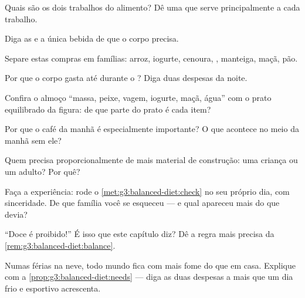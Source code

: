 \begin{exercise}[$\star$]\label{exo:g3:balanced-diet:1}
Quais são os dois trabalhos do alimento? Dê uma 
que serve principalmente a cada trabalho.
\end{exercise}

\begin{exercise}[$\star$]\label{exo:g3:balanced-diet:2}
Diga as  e a única bebida de que o corpo
precisa.
\end{exercise}

\begin{exercise}[$\star$]\label{exo:g3:balanced-diet:3}
Separe estas compras em famílias: arroz, iogurte, cenoura, ,
manteiga, maçã, pão.
\end{exercise}

\begin{exercise}[$\star$]\label{exo:g3:balanced-diet:4}
Por que o corpo gasta  até durante o ? Diga duas despesas
da noite.
\end{exercise}

\begin{exercise}[$\star$]\label{exo:g3:balanced-diet:5}
Confira o almoço ``massa, peixe, vagem, iogurte, maçã, água'' com o
prato equilibrado da figura: de que parte do prato é cada item?
\end{exercise}

\begin{exercise}[$\star$]\label{exo:g3:balanced-diet:6}
Por que o café da manhã é especialmente importante? O que acontece
no meio da manhã sem ele?
\end{exercise}

\begin{exercise}[$\star$]\label{exo:g3:balanced-diet:7}
Quem precisa proporcionalmente de mais material de construção: uma
criança ou um adulto? Por quê?
\end{exercise}

\begin{exercise}[$\star$]\label{exo:g3:balanced-diet:8}
Faça a experiência: rode o \cref{met:g3:balanced-diet:check} no seu
próprio dia, com sinceridade. De que família você se esqueceu --- e
qual apareceu mais do que devia?
\end{exercise}

\begin{exercise}[$\star\star$]\label{exo:g3:balanced-diet:9}
``Doce é proibido!'' É isso que este capítulo diz? Dê a regra mais
precisa da \cref{rem:g3:balanced-diet:balance}.
\end{exercise}

\begin{exercise}[$\star\star$]\label{exo:g3:balanced-diet:10}
Numas férias na neve, todo mundo fica com mais fome do que em casa.
Explique com a \cref{prop:g3:balanced-diet:needs} --- diga as duas
despesas a mais que um dia frio e esportivo acrescenta.
\end{exercise}
